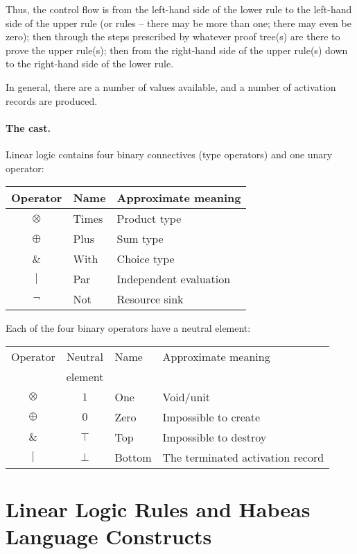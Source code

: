 \documentclass[a4paper]{article}
\begin{document}
Thus, the control flow is from the left-hand side of the lower rule to
the left-hand side of the upper rule (or rules -- there may be more
than one; there may even be zero); then through the steps prescribed
by whatever proof tree(s) are there to prove the upper rule(s); then
from the right-hand side of the upper rule(s) down to the right-hand
side of the lower rule.

In general, there are a number of values available, and a number of
activation records are produced.

\paragraph{The cast.} Linear logic contains four binary connectives (type operators) and
one unary operator:
\begin{center}
  \begin{tabular}{c|l|l}
    \hline
    \hline
    Operator & Name & Approximate meaning\\
    \hline
    $\otimes$ & Times & Product type\\
    $\oplus$  & Plus  & Sum type\\
    $\&$      & With  & Choice type\\
    $|$       & Par   & Independent evaluation\\
    \hline
    $\lnot$   & Not   & Resource sink\\
    \hline
  \end{tabular}
\end{center}

Each of the four binary operators have a neutral element:
\begin{center}
  \begin{tabular}{c|c|l|l}
    \hline
    \hline
    Operator & Neutral & Name & Approximate meaning\\
             & element &&\\
    \hline
    $\otimes$ & $1$    & One    & Void/unit\\
    $\oplus$  & $0$    & Zero   & Impossible to create\\
    $\&$      & $\top$ & Top    & Impossible to destroy\\
    $|$       & $\bot$ & Bottom & The terminated activation record\\
    \hline
  \end{tabular}
\end{center}


\section{Linear Logic Rules and Habeas Language Constructs}
\end{document}
